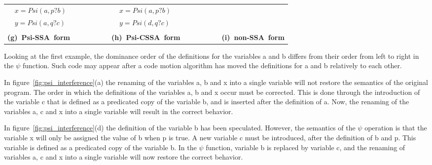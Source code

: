 \begin{figure*}
\begin{center}
\begin{tabular}{llllllll}
            & ${x = Psi(a,p?b)}$ & \ \ \ \ \ \ \ \  &     & ${x = Psi(a,p?b)}$  & \ \ \ \ \ \ \ \ &     & \\
            & ${y = Psi(a,q?c)}$ & \ \ \ \ \ \ \ \  &     & ${y = Psi(d,q?c)}$  & \ \ \ \ \ \ \ \ &     & \\
\\
\multicolumn{2}{l}{\bf (g)\ Psi-SSA\ form} & \ \ \ \ \ \ \ \  &\multicolumn{2}{l}{\bf (h)\ Psi-CSSA\ form} & \ \ \ \ \ \ \ \  &\multicolumn{2}{l}{\bf (i)\ non-SSA\ form} \\
\end{tabular}
\caption{$\psi$-SSA, $\psi$-CSSA forms and non-SSA form after destruction}
\label{fig:psi_interference}
\end{center}
\end{figure*}


Looking at the first example, the dominance order of the definitions
for the variables {a} and {b} differs from their order from
left to right in the $\psi$ function. Such code may appear after a
code motion algorithm has moved the definitions for {a} and {
b} relatively to each other.


In figure~\ref{fig:psi_interference}(a) the renaming of the variables
{a}, {b} and {x} into a single variable will not restore
the semantics of the original program. The order in which the
definitions of the variables {a}, {b} and {x} occur must
be corrected. This is done through the introduction of the variable
{c} that is defined as a predicated copy of the variable {b},
and is inserted after the definition of {a}. Now, the renaming of
the variables {a}, {c} and {x} into a single variable will
result in the correct behavior.

In figure~\ref{fig:psi_interference}(d) the definition of the variable
{b} has been speculated. However, the semantics of the $\psi$
operation is that the variable {x} will only be assigned the value
of {b} when {p} is true. A new variable {c} must be
introduced, after the definition of {b} and {p}. This variable
is defined as a predicated copy of the variable {b}. In the
${\psi}$ function, variable {b} is replaced by variable {c},
and the renaming of variables {a}, {c} and {x} into a
single variable will now restore the correct behavior.

